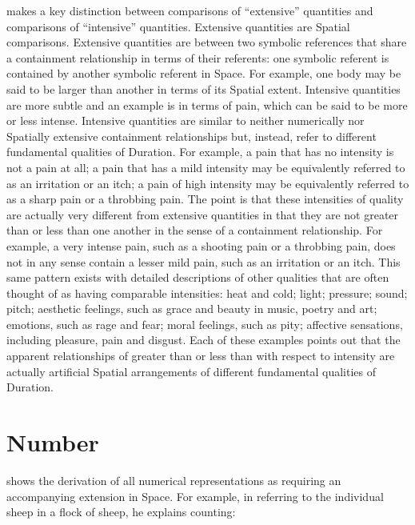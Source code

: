 \cite{bergson:1910} makes a key distinction between comparisons of
``extensive'' quantities and comparisons of ``intensive'' quantities.
Extensive quantities are Spatial comparisons.  Extensive quantities
are between two symbolic references that share a containment
relationship in terms of their referents: one symbolic referent is
contained by another symbolic referent in Space.  For example, one
body may be said to be larger than another in terms of its Spatial
extent.  Intensive quantities are more subtle and an example is in
terms of pain, which can be said to be more or less intense.
Intensive quantities are similar to neither numerically nor Spatially
extensive containment relationships but, instead, refer to different
fundamental qualities of Duration.  For example, a pain that has no
intensity is not a pain at all; a pain that has a mild intensity may
be equivalently referred to as an irritation or an itch; a pain of
high intensity may be equivalently referred to as a sharp pain or a
throbbing pain.  The point is that these intensities of quality are
actually very different from extensive quantities in that they are not
greater than or less than one another in the sense of a containment
relationship.  For example, a very intense pain, such as a shooting
pain or a throbbing pain, does not in any sense contain a lesser mild
pain, such as an irritation or an itch.  This same pattern exists with
detailed descriptions of other qualities that are often thought of as
having comparable intensities: heat and cold; light; pressure; sound;
pitch; aesthetic feelings, such as grace and beauty in music, poetry
and art; emotions, such as rage and fear; moral feelings, such as
pity; affective sensations, including pleasure, pain and disgust.
Each of these examples points out that the apparent relationships of
greater than or less than with respect to intensity are actually
artificial Spatial arrangements of different fundamental qualities of
Duration.

\section{Number}
\label{section:number}

\cite{bergson:1910} shows the derivation of all numerical
representations as requiring an accompanying extension in Space.  For
example, in referring to the individual sheep in a flock of sheep, he
explains counting:

